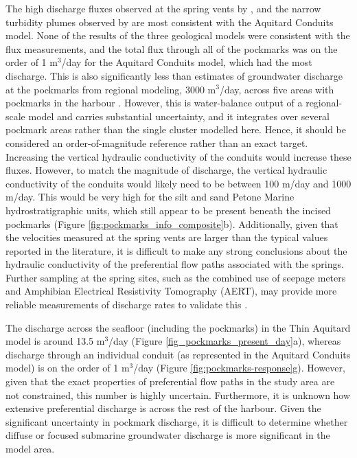 \documentclass[draft, 10pt]{agujournal2019}
\begin{document}
The high discharge fluxes observed at the spring vents by , and the narrow turbidity plumes observed by  are most consistent with the Aquitard Conduits model.
None of the results of the three geological models were consistent with the flux measurements, and the total flux through all of the pockmarks was on the order of 1 m$^3$/day for the Aquitard Conduits model, which had the most discharge.
This is also significantly less than estimates of groundwater discharge at the pockmarks from regional modeling, 3000 m$^3$/day, across five areas with pockmarks in the harbour \cite{bennett_hutt_2024}.
However, this is water-balance output of a regional-scale model and carries substantial uncertainty, and it integrates over several pockmark areas rather than the single cluster modelled here.
Hence, it should be considered an order-of-magnitude reference rather than an exact target.
Increasing the vertical hydraulic conductivity of the conduits would increase these fluxes.
However, to match the magnitude of discharge, the vertical hydraulic conductivity of the conduits would likely need to be between 100 m/day and 1000 m/day.
This would be very high for the silt and sand Petone Marine hydrostratigraphic units, which still appear to be present beneath the incised pockmarks (Figure \ref{fig:pockmarks_info_composite}b).
Additionally, given that the velocities measured at the spring vents are larger than the typical values reported in the literature, it is difficult to make any strong conclusions about the hydraulic conductivity of the preferential flow paths associated with the springs.
Further sampling at the spring sites, such as the combined use of seepage meters and Amphibian Electrical Resistivity Tomography (AERT), may provide more reliable measurements of discharge rates to validate this \cite{diego-feliu_combining_2025}.

The discharge across the seafloor (including the pockmarks) in the Thin Aquitard model is around 13.5 m$^3$/day (Figure \ref{fig_pockmarks_present_day}a),
whereas discharge through an individual conduit (as represented in the Aquitard Conduits model) is on the order of 1 m$^3$/day (Figure \ref{fig:pockmarks-response}g).
However, given that the exact properties of preferential flow paths in the study area are not constrained, this number is highly uncertain.
Furthermore, it is unknown how extensive preferential discharge is across the rest of the harbour.
Given the significant uncertainty in pockmark discharge, it is difficult to determine whether diffuse or focused submarine groundwater discharge is more significant in the model area.
\end{document}

